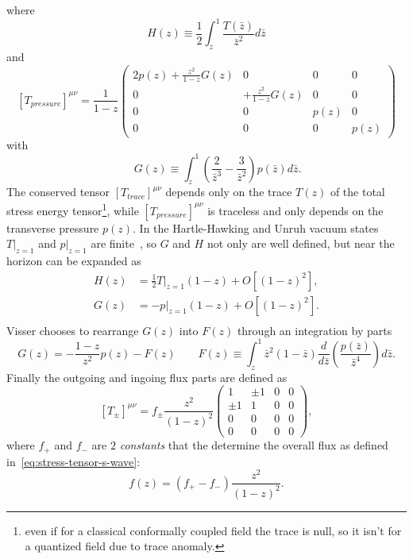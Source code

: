 where 
\[
    H(z)\equiv \frac{1}{2}\int_{z}^{1} \frac{T(\bar{z})}{\bar{z}^2}d\bar{z}    
\]
and 
\[
    \left[T_{pressure}\right]^{\mu\nu} = \frac{1}{1 - z}
    \begin{pmatrix}
        2p(z) + \frac{z^2}{1 - z}G(z) & 0 & 0 & 0 \\
        0 & + \frac{z^2}{1 - z}G(z) & 0 & 0 \\
        0 & 0 & p(z) & 0 \\
        0 & 0 & 0 & p(z)
    \end{pmatrix} 
\]
with 
\[
    \quad \quad G(z)\equiv \int_{z}^{1} \left(\frac{2}{\bar{z}^3} - \frac{3}{\bar{z}^2}\right)p(\bar{z})d\bar{z}.    
\]
The conserved tensor \(\left[T_{trace}\right]^{\mu\nu}\) depends only on the trace \(T(z)\) of the total stress energy tensor\footnote{even if for a classical conformally coupled field the trace is null, so it isn't for a quantized field due to trace anomaly.}, while \(\left[T_{pressure}\right]^{\mu\nu}\) is traceless and only depends on the transverse pressure \(p(z)\). In the Hartle-Hawking and Unruh vacuum states \(T\vert_{z = 1}\) and \(p\vert_{z = 1}\) are finite~\cite[]{christensen1977trace,jensen1991renormalized}, so \(G\) and \(H\) not only are well defined, but near the horizon can be expanded as 
\begin{align*}
    H(z) &= \frac{1}{2}T\vert_{z = 1}(1 - z) + O[(1 - z)^2],\\
    G(z) &= -p\vert_{z = 1}(1 - z) + O[(1 - z)^2].\\
\end{align*}
Visser chooses to rearrange \(G(z)\) into \(F(z)\) through an integration by parts
\[
G(z) = - \frac{1 - z}{z^2}p(z) - F(z) \quad \quad F(z) \equiv \int_z^1 \bar{z}^2(1 - \bar{z})\frac{d}{d\bar{z}}\left(\frac{p(\bar{z})}{\bar{z}^4}\right) d\bar{z}.   
\]
Finally the outgoing and ingoing flux parts are defined as 
\[
    \left[T_{\pm}\right]^{\mu\nu} = f_{\pm} \frac{z^2}{(1 - z)^2}
    \begin{pmatrix}
        1 & \pm 1 & 0 & 0 \\
        \pm 1 & 1 & 0 & 0 \\
        0 & 0 & 0 & 0 \\
        0 & 0 & 0 & 0
    \end{pmatrix},
\]
where \(f_+\) and \(f_-\) are \(2\) \emph{constants} that the determine the overall flux as defined in~\eqref{eq:stress-tensor-s-wave}:
\[
f(z) = \left(f_+ - f_-\right) \frac{z^2}{(1 - z)^2}. 
\]
